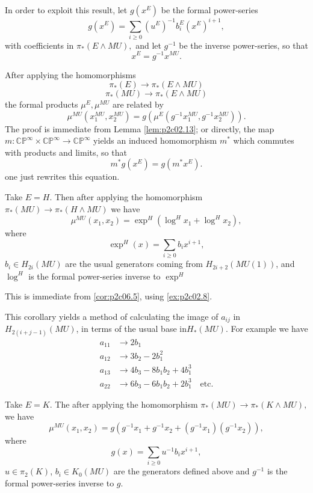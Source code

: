 \documentclass[../main]{subfiles}
\begin{document}
In order to exploit this result, let $g\left(x^E\right)$ be the formal power-series
\begin{equation}
\label{eqn:p2c06.4}
\tag{6.4}
    g\left(x^E\right)=\sum_{i\geq 0}\left(u^E\right)^{-1}b_i^E\left(x^E\right)^{i+1},
\end{equation}
with coefficients in $\pi_\ast(E\wedge MU),$ and let $g^{-1}$ be the inverse power-series, so that
$$x^E=g^{-1}x^{MU}.$$

\begin{corollary}
\label{cor:p2c06.5}
After applying the homomorphisms
$$\pi_\ast(E)\longrightarrow \pi_\ast(E\wedge MU)$$
$$\pi_\ast(MU)\longrightarrow \pi_\ast(E\wedge MU)$$
the formal products $\mu^E,\mu^{MU}$ are related by 
$$\mu^{MU}\left(x_1^{MU},x_2^{MU}\right)=g\left(\mu^E\left(g^{-1}x_1^{MU},g^{-1}x_2^{MU}\right)\right).$$
The proof is immediate from Lemma \ref{lem:p2c02.13}; or directly, the map $m:\mathbb{CP}^\infty\times\mathbb{CP}^\infty\longrightarrow \mathbb{CP}^\infty$ yields an induced homomorphism $m^\ast$ which commutes with products and limits, so that 
$$m^\ast g\left(x^E\right)=g\left(m^\ast x^E\right).$$
one just rewrites this equation.
\end{corollary}
\begin{corollary}
\label{cor:p2c06.6}
Take $E=H.$ Then after applying the homomorphism $\pi_\ast(MU)\longrightarrow \pi_\ast(H\wedge MU)$ we have 
$$\mu^{MU}(x_1,x_2)=\exp^H(\log^Hx_1+\log^Hx_2),$$
where 
$$\exp^H(x)=\sum_{i\geq 0}b_ix^{i+1},$$
$b_i\in H_{2i}(MU)$ are the usual generators coming from $H_{2i+2}(MU(1))$, and $\log^H$ is the formal power-series inverse to $\exp^H$
\end{corollary}
This is immediate from \eqref{cor:p2c06.5}, using \eqref{ex:p2c02.8}.

This corollary yields a method of calculating the image of $a_{ij}$ in $H_{2(i+j-1)}(MU)$, in terms of the usual base in$H_\ast(MU)$. For example we have 
\begin{align*}
    a_{11} &\longrightarrow 2b_1  \\
    a_{12} &\longrightarrow 3b_2-2b_1^2  \\ 
    a_{13} &\longrightarrow 4b_3-8b_1b_2+4b_1^3  \\
    a_{22} &\longrightarrow 6b_3-6b_1b_2+2b_1^3 \quad \text{etc.} 
\end{align*}
\begin{corollary}
\label{cor:p2c06.7}
Take $E=K$. The after applying the homomorphism $\pi_\ast(MU)\longrightarrow \pi_\ast(K\wedge MU),$ we have
$$\mu^{MU}(x_1,x_2)=g\left(g^{-1}x_1+g^{-1}x_2+\left(g^{-1}x_1\right)\left(g^{-1}x_2\right)\right),$$
where 
$$g(x)=\sum_{i\geq 0} u^{-1}b_ix^{i+1},$$
$u\in \pi_2(K)$, $b_i\in K_0(MU)$ are the generators defined above and $g^{-1}$ is the formal power-series inverse to $g$.
\end{corollary}
\end{document}
